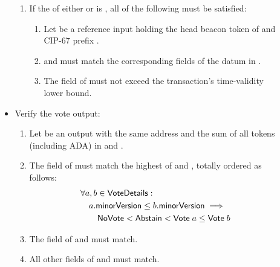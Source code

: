 \documentclass[../hydrozoa.tex]{subfiles}
\begin{document}
\begin{description}
\begin{itemize}
        \begin{enumerate}[resume]
          \item If the  of either  or  is , all of the following must be satisfied:
            \begin{enumerate}
              \item Let  be a reference input holding the head beacon token of  and CIP-67 prefix \headBeaconToken{}.
              \item {} and  must match the corresponding fields of the  datum in .
              \item The  field of  must not exceed the transaction's time-validity lower bound.
            \end{enumerate}
        \end{enumerate}
      \item Verify the vote output:
        \begin{enumerate}[resume]
          \item Let  be an output with the same address and the sum of all tokens (including ADA) in  and .
          \item The  field of  must match the highest  of  and , totally ordered as follows:
            \begin{equation*}
            \begin{split}
              &\forall a, b \in \mathsf{VoteDetails}:\\
              &\quad a \mathsf{.minorVersion} \leq b \mathsf{.minorVersion} \implies\\
              &\qquad \mathsf{NoVote} < \mathsf{Abstain} < \mathsf{Vote} \; a \leq \mathsf{Vote} \; b  
            \end{split}
            \end{equation*}
          \item The  field of  and  must match.
          \item All other fields of  and  must match.
        \end{enumerate}
    \end{itemize}
\end{description}
\end{document}
